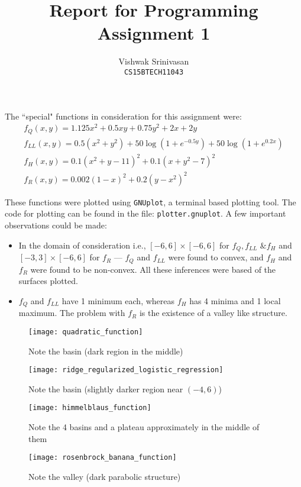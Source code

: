 \documentclass{article}
\title{Report for Programming Assignment 1}
\author{Vishwak Srinivasan\\
\texttt{CS15BTECH11043}}
\date{}
\begin{document}
\maketitle
\begin{flushleft}
The ``special" functions in consideration for this assignment were:
\begin{gather*}
f_{Q}(x, y) = 1.125x^2 + 0.5xy + 0.75y^2 + 2x + 2y \\
f_{LL}(x, y) = 0.5(x^2 + y^2) + 50\log\left(1 + e^{-0.5y}\right) + 50\log\left(1 + e^{0.2x}\right) \\
f_{H}(x, y) = 0.1(x^2 + y - 11)^2 + 0.1(x + y^2 - 7)^2 \\
f_{R}(x, y) = 0.002(1 - x)^2 + 0.2(y - x^2)^2
\end{gather*}

These functions were plotted using \texttt{GNUplot}, a terminal based plotting tool. The code for plotting can be found in the file: \texttt{plotter.gnuplot}. A few important observations could be made:
\begin{itemize}
\item In the domain of consideration i.e., \([-6, 6]\times[-6, 6]\) for \(f_{Q}, f_{LL} \text{ \& } f_{H}\) and \([-3, 3] \times [-6, 6]\) for \(f_{R}\) --- \(f_{Q}\) and \(f_{LL}\) were found to convex, and \(f_{H}\) and \(f_{R}\) were found to be non-convex. All these inferences were based of the surfaces plotted.
\item \(f_{Q}\) and \(f_{LL}\) have 1 minimum each, whereas \(f_{H}\) has 4 minima and 1 local maximum. The problem with \(f_{R}\) is the existence of a valley like structure.
\end{itemize}

\begin{figure}[H]
\begin{minipage}{0.45\linewidth}
\centering
\texttt{[image: quadratic\_function]}
\caption{Note the basin (dark region in the middle)}
\end{minipage}
\hfill
\begin{minipage}{0.45\linewidth}
\centering
\texttt{[image: ridge\_regularized\_logistic\_regression]}
\caption{Note the basin (slightly darker region near \((-4, 6)\))}
\end{minipage}
\end{figure}

\begin{figure}[H]
\begin{minipage}{0.45\linewidth}
\centering
\texttt{[image: himmelblaus\_function]}
\caption{Note the 4 basins and a plateau approximately in the middle of them}
\end{minipage}
\hfill
\begin{minipage}{0.45\linewidth}
\centering
\texttt{[image: rosenbrock\_banana\_function]}
\caption{Note the valley (dark parabolic structure)}
\end{minipage}
\end{figure}


\end{flushleft}
\end{document}
